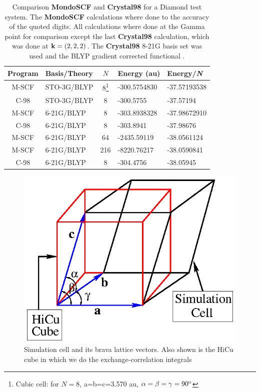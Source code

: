 \documentclass[prb,aps,nobibnotes,twocolumn,doublespace,twocolumngrid,superbib]{revtex4}
\begin{document}
\begin{table}
\caption{Comparison \textbf{MondoSCF} and \textbf{Crystal98} for a 
Diamond test system.  The \textbf{MondoSCF} calculations where done to
the accuracy of the quoted digits. All calculations where done at the Gamma point
for comparison except the last \textbf{Crystal98} calculation, which was done at ${\bf k}=(2,2,2)$.
The \textbf{Crystal98} 8-21G  basis set was used \cite{C98Basis} and the BLYP gradient corrected 
functional \cite{Becke93}.}
\label{table:ComToCrystal98_3}

\begin{tabular}{clcll}
\hline 
Program&
Basis/Theory&
\( N \)&
Energy (au)&
Energy/{\it N}\\
\hline
\hline 
M-SCF&
STO-3G/BLYP&
8\footnote[1]{Cubic cell: for $N=8$, a=b=c=3.570 au, $\alpha=\beta=\gamma=90^{{\rm o}}$}&
-300.5754830 &
-37.57193538 \\
C-98&
STO-3G/BLYP&
8\footnotemark[1]&
-300.5755 &
-37.57194 \\
M-SCF&
6-21G/BLYP&
8\footnotemark[1]&
-303.8938328 &
-37.98672910 \\
C-98&
6-21G/BLYP&
8\footnotemark[1]&
-303.8941 &
-37.98676 \\
\hline 
M-SCF&
6-21G/BLYP&
64\footnotemark[1]&
-2435.59119 &
-38.0561124\\
M-SCF&
6-21G/BLYP&
216\footnotemark[1]&
-8220.76217 &
-38.0590841 \\
\hline
\,\,C-98\,\,&
6-21G/BLYP\,\,&
\,\,8\footnotemark[1]\,\,&
-304.4756 &
-38.05945\\
\hline
\end{tabular}
\end{table}
%
%
%
\eject
%
%
%
\begin{figure}

\caption{\label{figure:SimCell} Simulation cell and its brava lattice vectors. Also
shown is the HiCu cube in which we do the exchange-correlation integrals}
{\centering \includegraphics{UnitCell_2.ps} \par}
\end{figure}
\end{document}
